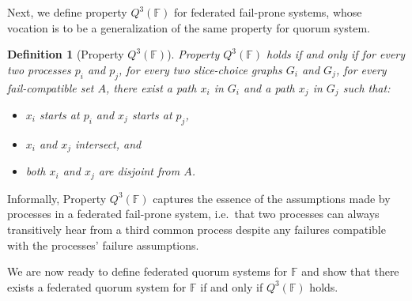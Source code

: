\documentclass[11pt]{article}
\newtheorem{definition}{Definition}
\begin{document}


Next, we define property $Q^3(\mathbb{F})$ for federated fail-prone systems, whose vocation is to be a generalization of the same property for quorum system.
\begin{definition}[Property $Q^3(\mathbb{F})$]
  Property $Q^3(\mathbb{F})$ holds if and only if for every two processes $p_i$ and $p_j$, for every two slice-choice graphs $G_i$ and $G_j$, for every fail-compatible set $A$, there exist a path $x_i$ in $G_i$ and a path $x_j$ in $G_j$ such that:
  \begin{itemize}
    \item $x_i$ starts at $p_i$ and $x_j$ starts at $p_j$,
    \item $x_i$ and $x_j$ intersect, and
    \item both $x_i$ and $x_j$ are disjoint from $A$.
  \end{itemize}
\end{definition}

Informally, Property $Q^3(\mathbb{F})$ captures the essence of the assumptions made by processes in a federated fail-prone system, i.e.\ that two processes can always transitively hear from a third common process despite any failures compatible with the processes' failure assumptions.


We are now ready to define federated quorum systems for $\mathbb{F}$ and show that there exists a federated quorum system for $\mathbb{F}$ if and only if $Q^3(\mathbb{F})$ holds.
\end{document}
